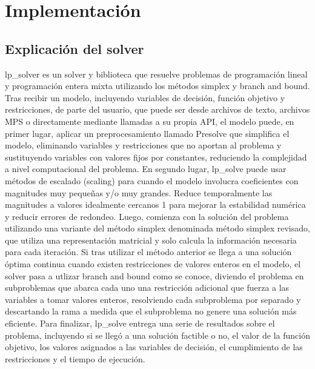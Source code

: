\section{Implementación}
\subsection{Explicación del solver}
lp\_solver es un solver y biblioteca que resuelve problemas de programación lineal y programación entera mixta utilizando los métodos simplex y branch and bound.
\newline Tras recibir un modelo, incluyendo variables de decisión, función objetivo y restricciones, de parte del usuario, que puede ser desde archivos de texto, archivos MPS o directamente mediante llamadas a su propia API, el modelo puede, en primer lugar, aplicar un preprocesamiento llamado Presolve que simplifica el modelo, eliminando variables y restricciones que no aportan al problema y sustituyendo variables con valores fijos por constantes, reduciendo la complejidad a nivel computacional del problema.
\newline En segundo lugar, lp\_solve puede usar métodos de escalado (scaling) para cuando el modelo involucra coeficientes con magnitudes muy pequeñas y/o muy grandes. Reduce temporalmente las magnitudes a valores idealmente cercanos 1 para mejorar la estabilidad numérica y reducir errores de redondeo.
\newline Luego, comienza con la solución del problema utilizando una variante del método simplex denominada método simplex revisado, que utiliza una representación matricial y solo calcula la información necesaria para cada iteración.
\newline Si tras utilizar el método anterior se llega a una solución óptima continua cuando existen restricciones de valores enteros en el modelo, el solver pasa a utlizar branch and bound como se conoce, diviendo el problema en subproblemas que abarca cada uno una restricción adicional que fuerza a las variables a tomar valores enteros, resolviendo cada subproblema por separado y descartando la rama a medida que el subproblema no genere una solución más eficiente.
\newline Para finalizar, lp\_solve entrega una serie de resultados sobre el problema, incluyendo si se llegó a una solución factible o no, el valor de la función objetivo, los valores asignados a las variables de decisión, el cumplimiento de las restricciones y el tiempo de ejecución.
